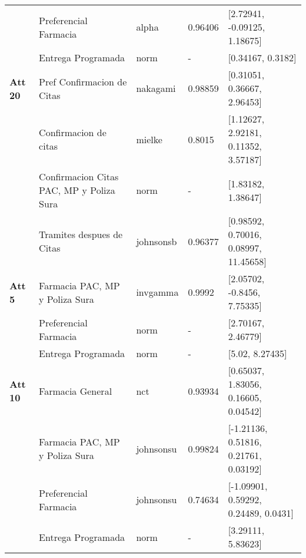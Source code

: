 \begin{longtable}[c]{lp{3cm}llp{5cm}}
       & Preferencial Farmacia                    & alpha        & 0.96406 & {[}2.72941, -0.09125, 1.18675{]}                                                         \\
       & Entrega Programada                       & norm         & -       & {[}0.34167, 0.3182{]}                                                                    \\ \hline
\textbf{Att 20} & Pref Confirmacion de Citas               & nakagami     & 0.98859 & {[}0.31051, 0.36667, 2.96453{]}                                                          \\
       & Confirmacion de citas                    & mielke       & 0.8015  & {[}1.12627, 2.92181, 0.11352, 3.57187{]}                                                 \\
       & Confirmacion Citas PAC, MP y Poliza Sura & norm         & -       & {[}1.83182, 1.38647{]}                                                                   \\
       & Tramites despues de Citas                & johnsonsb    & 0.96377 & {[}0.98592, 0.70016, 0.08997, 11.45658{]}                                                \\ \hline
\textbf{Att 5}  & Farmacia PAC, MP y Poliza Sura           & invgamma     & 0.9992  & {[}2.05702, -0.8456, 7.75335{]}                                                          \\
       & Preferencial Farmacia                    & norm         & -       & {[}2.70167, 2.46779{]}                                                                   \\
       & Entrega Programada                       & norm         & -       & {[}5.02, 8.27435{]}                                                                      \\ \hline
\textbf{Att 10} & Farmacia General                         & nct          & 0.93934 & {[}0.65037, 1.83056, 0.16605, 0.04542{]}                                                 \\
       & Farmacia PAC, MP y Poliza Sura           & johnsonsu    & 0.99824 & {[}-1.21136, 0.51816, 0.21761, 0.03192{]}                                                \\
       & Preferencial Farmacia                    & johnsonsu    & 0.74634 & {[}-1.09901, 0.59292, 0.24489, 0.0431{]}                                                 \\
       & Entrega Programada                       & norm         & -       & {[}3.29111, 5.83623{]}                                                                   \\ \hline

\end{longtable}
